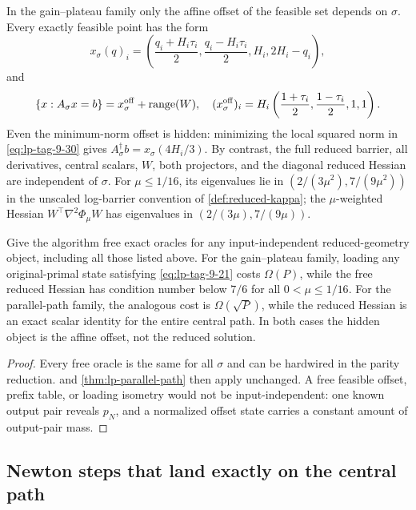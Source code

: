 In the gain--plateau family only the affine offset of the feasible set
depends on \(\sigma\).  Every exactly feasible
point has the form
\begin{equation}
 x_\sigma(q)_i=
 \left(\frac{q_i+H_i\tau_i}{2},
       \frac{q_i-H_i\tau_i}{2},H_i,2H_i-q_i\right),
\label{eq:lp-tag-9-30}
\end{equation}
and
\begin{equation}
 \{x:A_\sigma x=b\}=x_\sigma^{\rm off}+\operatorname{range}(W),
\quad
 (x_\sigma^{\rm off})_i
 =H_i\left(\frac{1+\tau_i}{2},\frac{1-\tau_i}{2},1,1\right).
\end{equation}
Even the minimum-norm offset is hidden: minimizing the local squared norm in
\eqref{eq:lp-tag-9-30} gives \(A_\sigma^\dagger b=x_\sigma(4H_i/3)\).  By contrast, the
full reduced barrier, all derivatives, central scalars, \(W\), both
projectors, and the diagonal reduced Hessian are independent of \(\sigma\).
For \(\mu\leq1/16\), its eigenvalues lie in
\((2/(3\mu^2),7/(9\mu^2))\) in the unscaled log-barrier convention of
\cref{def:reduced-kappa}; the \(\mu\)-weighted Hessian
\(W^\top\nabla^2\Phi_\mu W\) has eigenvalues in
\((2/(3\mu),7/(9\mu))\).

\begin{corollary}
\label{cor:lp-affine-dichotomy}
Give the algorithm free exact oracles for any input-independent
reduced-geometry object, including all those listed above.
For the gain--plateau family, loading any original-primal state satisfying
\eqref{eq:lp-tag-9-21} costs \(\Omega(P)\), while the free reduced Hessian
has condition number below \(7/6\) for all \(0<\mu\leq1/16\).  For the parallel-path family, the analogous
cost is \(\Omega(\sqrt P)\), while the reduced Hessian is an exact scalar
identity for the entire central path.  In both cases the hidden object is the
affine offset, not the reduced solution.
\end{corollary}

\begin{proof}
Every free oracle is the same for all \(\sigma\) and can be hardwired in
the parity reduction.   and
\cref{thm:lp-parallel-path} then apply unchanged.  A free feasible
offset, prefix table, or loading isometry would not be input-independent: one
known output pair reveals \(p_N\), and a normalized offset state carries a
constant amount of output-pair mass.
\end{proof}

\subsection{Newton steps that land exactly on the central path}
\label{sec:lp-newton-secants}

